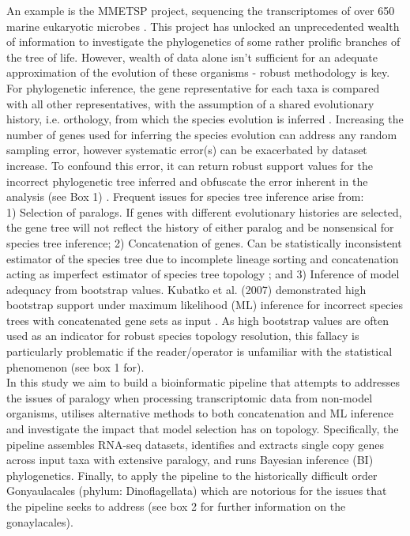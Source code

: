 \documentclass[12pt]{article}
\begin{document}
An example is the MMETSP project, sequencing the transcriptomes of over 650 marine eukaryotic microbes \cite{keeling2014marine}. 
This project has unlocked an unprecedented wealth of information to investigate the phylogenetics of some rather prolific branches of the tree of life. 
However, wealth of data alone isn't sufficient for an adequate approximation of the evolution of these organisms - robust methodology is key. 
For phylogenetic inference, the gene representative for each taxa is compared with all other representatives, with the assumption of a shared evolutionary history, i.e. orthology, from which the species evolution is inferred \cite{maddison1997gene}. 
Increasing the number of genes used for inferring the species evolution can address any random sampling error, however systematic error(s) can be exacerbated by dataset increase. To confound this error, it can return robust support values for the incorrect phylogenetic tree inferred and obfuscate the error inherent in the analysis (see Box 1) \cite{jeffroy2006phylogenomics,roch2015likelihood,kubatko2007inconsistency}. 
Frequent issues for species tree inference arise from:\\
1) Selection of paralogs. If genes with different evolutionary histories are selected, the gene tree will not reflect the history of either paralog and be nonsensical for species tree inference; 
2) Concatenation of genes. Can be statistically inconsistent estimator of the species tree due to incomplete lineage sorting and concatenation acting as imperfect estimator of species tree topology \cite{roch2015likelihood}; and 
3) Inference of model adequacy from bootstrap values. Kubatko et al. (2007) demonstrated high bootstrap support under maximum likelihood (ML) inference for incorrect species trees with concatenated gene sets as input \cite{kubatko2007inconsistency}. 
As high bootstrap values are often used as an indicator for robust species topology resolution, this fallacy is particularly problematic if the reader/operator is unfamiliar with the statistical phenomenon (see box 1 for).\\
In this study we aim to build a bioinformatic pipeline that attempts to addresses the issues of paralogy when processing transcriptomic data from non-model organisms, utilises alternative methods to both concatenation and ML inference and investigate the impact that model selection has on topology. 
Specifically, the pipeline assembles RNA-seq datasets, identifies and extracts single copy genes across input taxa with extensive paralogy, and runs Bayesian inference (BI) phylogenetics. 
Finally, to apply the pipeline to the historically difficult order Gonyaulacales (phylum: Dinoflagellata) which are notorious for the issues that the pipeline seeks to address (see box 2 for further information on the gonaylacales).\\
\end{document}
